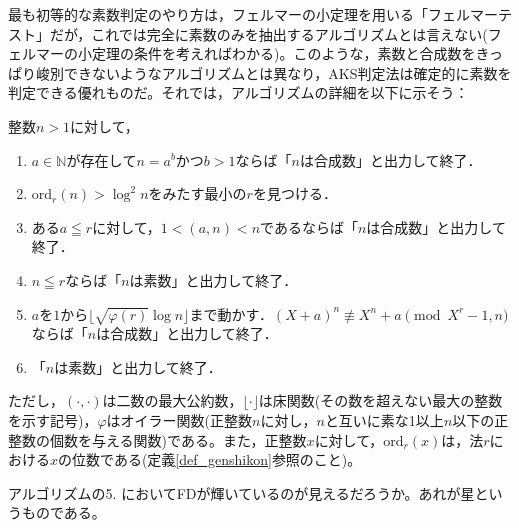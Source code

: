 最も初等的な素数判定のやり方は，フェルマーの小定理を用いる「フェルマーテスト」だが，これでは完全に素数のみを抽出するアルゴリズムとは言えない(フェルマーの小定理の条件を考えればわかる)。このような，素数と合成数をきっぱり峻別できないようなアルゴリズムとは異なり，AKS判定法は確定的に素数を判定できる優れものだ。それでは，アルゴリズムの詳細を以下に示そう：

整数$n>1$に対して，
\begin{enumerate}
    \item $a\in \mathbb{N}が存在してn=a^bかつb>1$ならば「$n$は合成数」と出力して終了．
    \item $\mathrm{ord}_r(n)>\log^2n$をみたす最小の$r$を見つける．
    \item ある$a\leqq r$に対して，$1<(a,n)<n$であるならば「$n$は合成数」と出力して終了．
    \item $n\leqq r$ならば「$n$は素数」と出力して終了．
    \item $a$を$1$から$\lfloor\sqrt{\varphi(r)}\log n\rfloor$まで動かす．$(X+a)^n\not\equiv X^n+a \pmod {X^r-1,n}$ならば「$n$は合成数」と出力して終了．
    \item 「$n$は素数」と出力して終了．
\end{enumerate}

ただし，$(\cdot ,\cdot)$は二数の最大公約数，$\lfloor\cdot\rfloor$は床関数(その数を超えない最大の整数を示す記号)，$\varphi$はオイラー関数(正整数$n$に対し，$n$と互いに素な1以上$n$以下の正整数の個数を与える関数)である。また，正整数$x$に対して，$\mathrm{ord}_r(x)$は，法$r$における$x$の位数である(定義\ref{def_genshikon}参照のこと)。

アルゴリズムの5. において\textsf{FD}が輝いているのが見えるだろうか。あれが星というものである。



